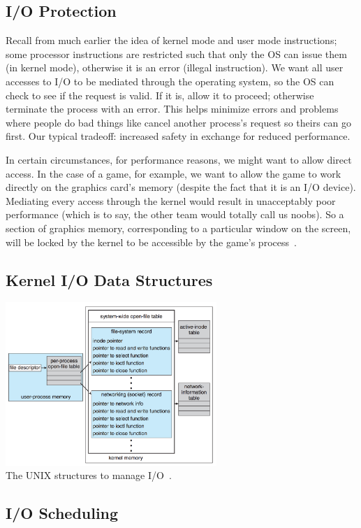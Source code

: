 \subsection*{I/O Protection}
Recall from much earlier the idea of kernel mode and user mode instructions; some processor instructions are restricted such that only the OS can issue them (in kernel mode), otherwise it is an error (illegal instruction). We want all user accesses to I/O to be mediated through the operating system, so the OS can check to see if the request is valid. If it is, allow it to proceed; otherwise terminate the process with an error. This helps minimize errors and problems where people do bad things like cancel another process's request so theirs can go first. Our typical tradeoff: increased safety in exchange for reduced performance.

In certain circumstances, for performance reasons, we might want to allow direct access. In the case of a game, for example, we want to allow the game to work directly on the graphics card's memory (despite the fact that it is an I/O device). Mediating every access through the kernel would result in unacceptably poor performance (which is to say, the other team would totally call us noobs). So a section of graphics memory, corresponding to a particular window on the screen, will be locked by the kernel to be accessible by the game's process~\cite{osc}.

\subsection*{Kernel I/O Data Structures}

\begin{center}
	\includegraphics[width=0.6\textwidth]{images/unix-io-kernel.png}\\
	The UNIX structures to manage I/O~\cite{osc}.
\end{center}

\subsection*{I/O Scheduling}




